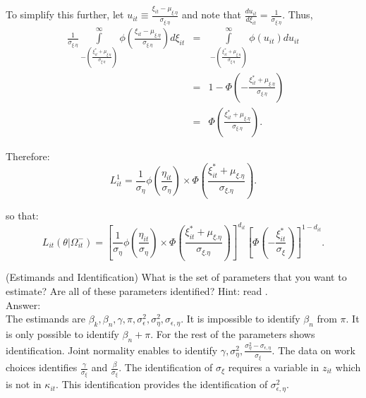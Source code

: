 \begin{exercise}
\noindent To simplify this further, let $u_{it} \equiv \frac{\xi_{it} - \mu_{\xi.\eta}}{\sigma_{\xi.\eta}}$ and note that $\frac{du_{it}}{d \xi_{it}} = \frac{1}{\sigma_{\xi.\eta}}$. Thus,
\begin{eqnarray}
\frac{1}{\sigma_{\xi.\eta}} \int \limits _{-  \left( \frac{\xi_{it}^{*} + \mu_{\xi.\eta}}{\sigma_{\xi.\eta}}  \right) } ^{\infty} \phi \left( \frac{\xi_{it} - \mu_{\xi.\eta}}{\sigma_{\xi.\eta}}  \right) d\xi_{it} &=& \int \limits _{-  \left( \frac{\xi_{it}^{*} + \mu_{\xi.\eta}}{\sigma_{\xi.\eta}}  \right) } ^{\infty} \phi (u_{it}) du_{it} \nonumber \\
&=& 1 - \Phi \left( -\frac{\xi_{it}^{*} + \mu_{\xi.\eta}}{\sigma_{\xi.\eta}} \right) \nonumber \\
&=& \Phi \left( \frac{\xi_{it}^{*} + \mu_{\xi.\eta}}{\sigma_{\xi.\eta}} \right).
\end{eqnarray}

\noindent Therefore:
\begin{equation}
L_{it}^1 = \frac{1}{\sigma_{\eta}} \phi \left( \frac{\eta_{it}}{\sigma_{\eta}} \right) \times \Phi \left( \frac{\xi_{it}^{*} + \mu_{\xi.\eta}}{\sigma_{\xi.\eta}} \right).
\end{equation}

\noindent so that:
\begin{equation}
L_{it} \left( \theta | \Omega_{it}^{-} \right) = \left[\frac{1}{\sigma_{\eta}} \phi \left( \frac{\eta_{it}}{\sigma_{\eta}} \right) \times \Phi \left( \frac{\xi_{it}^{*} + \mu_{\xi.\eta}}{\sigma_{\xi.\eta}} \right) \right]^{d_{it}} \left[ \Phi \left( - \frac{\xi_{it}^{*}}{\sigma_{\xi}}  \right) \right]^{1-d_{it}}.
\end{equation}

\end{exercise}

\begin{exercise} (Estimands and Identification) \label{exercise:estimands}
What is the set of parameters that you want to estimate? Are all of these parameters identified? Hint: read \citet{heckman1979sample}.\\ 
\noindent Answer:\\
\noindent The estimands are $\beta_{k}, \beta_{n}, \gamma, \pi, \sigma_{\epsilon}^2, \sigma_{\eta}^2, \sigma_{\epsilon, \eta} $. It is impossible to identify $\beta_{n}$ from $\pi$. It is only possible to identify $\beta_{n} + \pi$. For the rest of the parameters \citet{heckman1979sample} shows identification. Joint normality enables to identify $\gamma, \sigma_{\eta}^2, \frac{\sigma_{\eta}^2 - \sigma_{\epsilon, \eta}}{\sigma_{\xi}}$. The data on work choices identifies $\frac{\gamma}{\sigma_{\xi}}$ and $\frac{\beta}{\sigma_{\xi}}$. The identification of $\sigma_{\xi}$ requires a variable in $z_{it}$ which is not in $\kappa_{it}$. This identification provides the identification of $\sigma_{\epsilon, \eta}^2$. 
\end{exercise}

